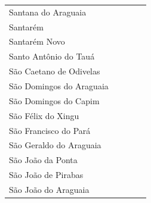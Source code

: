 \begin{table}[!htb]
{\begin{tabular}{l|c|c|c|c}
   Santana do Araguaia      &             &             &             &    \\
   Santarém                 &             &             &             &    \\
   Santarém Novo            &             &             &             &    \\
   Santo Antônio do Tauá    &             &             &             &    \\
   São Caetano de Odivelas  &             &             &             &    \\
   São Domingos do Araguaia &             &             &             &    \\
   São Domingos do Capim    &             &             &             &    \\
   São Félix do Xingu       &             &             &             &    \\
   São Francisco do Pará    &             &             &             &    \\
   São Geraldo do Araguaia  &             &             &             &    \\
   São João da Ponta        &             &             &             &    \\
   São João de Pirabas      &             &             &             &    \\
   São João do Araguaia     &             &             &             &    \\
\end{tabular}}
\end{table}





